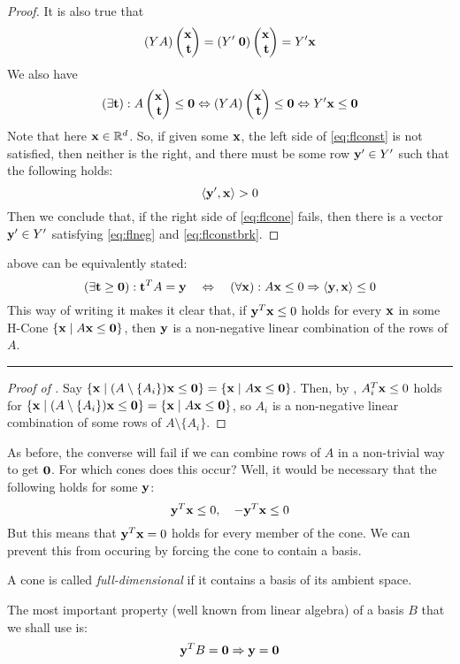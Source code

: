 \begin{proof}
	It is also true that
	\[ (YA)\xt = (Y'\;\0)\xt = Y'\x \]
	We also have
	\begin{equation}\label{eq:flconst}
		(\exists \t) : A \xt \leq \0 \Leftrightarrow
		(YA)\xt \leq \0 \Leftrightarrow
		Y'\x \leq \0
	\end{equation}
	Note that here $\mathbf{x} \in \mathbb{R}^d$.  So, if given some $\mathbf{x}$, the left side of \eqref{eq:flconst} is not satisfied, then neither is the right, and there must be some row $\mathbf{y}' \in Y'$ such that the following holds:
	\begin{equation}\label{eq:flconstbrk} \left\langle \mathbf{y}', \mathbf{x} \right\rangle > 0 \end{equation}
	Then we conclude that, if the right side of \eqref{eq:flcone} fails, then there is a vector $\mathbf{y}' \in Y'$ satisfying \eqref{eq:flneg} and \eqref{eq:flconstbrk}.
\end{proof}

\begin{Remark}\label{valid_cone_ineq}
	 above can be equivalently stated:
	\[ (\exists \mathbf{t} \geq \mathbf{0}) : \mathbf{t}^T A = \mathbf{y} \quad\Leftrightarrow\quad
		(\forall \mathbf{x}) : A\mathbf{x} \leq 0 \Rightarrow \left\langle \mathbf{y}, \mathbf{x} \right\rangle \leq 0 \]
	This way of writing it makes it clear that, if $\mathbf{y}^T\mathbf{x}\leq 0$ holds for every $\mathbf{x}$ in some H-Cone $\left\{\mathbf{x}\;|\; A\mathbf{x}\leq\mathbf{0}\right\}$, then $\mathbf{y}$ is a non-negative linear combination of the rows of $A$.
\end{Remark}

\hrule

\begin{proof}[Proof of ]
	Say $\left\{\mathbf{x}\;|\; (A\setminus\{A_i\})\mathbf{x}\leq\mathbf{0}\right\} = \left\{\mathbf{x}\;|\; A\mathbf{x}\leq\mathbf{0}\right\}$.  Then, by , $A_i^T\mathbf{x}\leq 0$ holds for $\left\{\mathbf{x}\;|\; (A\setminus\{A_i\})\mathbf{x}\leq\mathbf{0}\right\} = \left\{\mathbf{x}\;|\; A\mathbf{x}\leq\mathbf{0}\right\}$, so $A_i$ is a non-negative linear combination of some rows of $A\setminus\{A_i\}$.
\end{proof}

As before, the converse will fail if we can combine rows of $A$ in a non-trivial way to get $\mathbf{0}$.  For which cones does this occur?  Well, it would be necessary that the following holds for some $\mathbf{y}$:
\[ \mathbf{y}^T\mathbf{x} \leq 0,\quad -\mathbf{y}^T\mathbf{x}\leq 0 \]
But this means that $\mathbf{y}^T\mathbf{x} = 0$ holds for every member of the cone.  We can prevent this from occuring by forcing the cone to contain a basis.

\begin{Def}
	A cone is called \textit{full-dimensional} if it contains a basis of its ambient space.
\end{Def}

The most important property (well known from linear algebra) of a basis $B$ that we shall use is:
\begin{equation}
	\mathbf{y}^T B = \mathbf{0} \Rightarrow \mathbf{y} = \mathbf{0} \label{basis_li}
\end{equation}

